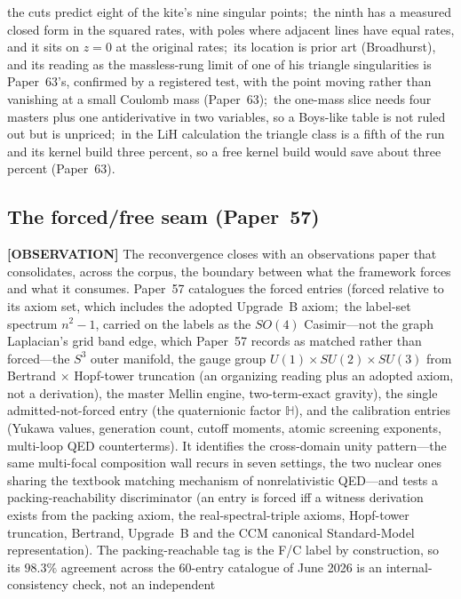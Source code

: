 \documentclass[aps,pra,twocolumn,superscriptaddress,longbibliography]{revtex4-2}
\newcommand{\gvc}[2]{#2}
\begin{document}
the cuts predict eight of the kite's nine singular points;\ the ninth has a
measured closed form in the squared rates, with poles where adjacent lines
have equal rates, and it sits on $z=0$ at the original rates;\ its location
is prior art (Broadhurst), and its reading as the massless-rung limit of one
of his triangle singularities is Paper~63's, confirmed by a registered test, with the point
moving rather than vanishing at a small Coulomb mass (Paper~63);\ the one-mass
slice needs four masters plus one antiderivative in two variables, so a
Boys-like table is not ruled out but is unpriced;\ in the LiH
calculation the triangle class is a fifth of the run
and its kernel build three percent, so a free kernel build would save about
three percent (Paper~63).

\subsection{The forced/free seam (Paper~57)}
\textbf{[OBSERVATION]} The reconvergence closes with an observations paper that consolidates,
across the corpus, the boundary between what the framework forces and
what it consumes.  Paper~57 catalogues the forced entries (forced
relative to its axiom set, which includes the adopted Upgrade~B axiom;\ the
label-set spectrum $n^2 - 1$, carried on the labels as the $SO(4)$
Casimir---not the graph Laplacian's grid band edge, which Paper~57 records
as matched rather than forced---the $S^3$ outer manifold, \gvc{sm-gauge-group-upgrade-b}{the gauge group $U(1) \times SU(2)
\times SU(3)$ from Bertrand $\times$ Hopf-tower truncation (an organizing reading plus an adopted axiom, not a derivation)}, the master
Mellin engine, two-term-exact gravity), the single admitted-not-forced
entry (the quaternionic factor $\mathbb{H}$), and the calibration
entries (Yukawa values, generation count, cutoff moments, atomic
screening exponents, multi-loop QED counterterms).  It identifies the
cross-domain unity pattern---the same multi-focal composition wall
recurs in seven settings, the two nuclear ones sharing the textbook
matching mechanism of nonrelativistic QED---and tests a packing-reachability
discriminator (an entry is forced iff a witness derivation exists from
the packing axiom, the real-spectral-triple axioms, Hopf-tower
truncation, Bertrand, Upgrade~B and the CCM canonical Standard-Model
representation).  The packing-reachable tag is the F/C label
by construction, so its $98.3\%$ agreement across the $60$-entry
catalogue of June 2026 is an internal-consistency check, not an independent
\end{document}
